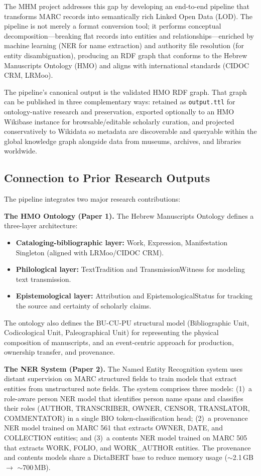 \documentclass[12pt]{article}
\newcommand{\code}[1]{\texttt{#1}}
\begin{document}
The MHM project addresses this gap by developing an end-to-end pipeline that transforms MARC records into semantically rich Linked Open Data (LOD). The pipeline is not merely a format conversion tool; it performs conceptual decomposition---breaking flat records into entities and relationships---enriched by machine learning (NER for name extraction) and authority file resolution (for entity disambiguation), producing an RDF graph that conforms to the Hebrew Manuscripts Ontology (HMO) and aligns with international standards (CIDOC CRM, LRMoo).

The pipeline's canonical output is the validated HMO RDF graph. That graph can be published in three complementary ways: retained as \code{output.ttl} for ontology-native research and preservation, exported optionally to an HMO Wikibase instance for browsable/editable scholarly curation, and projected conservatively to Wikidata so metadata are discoverable and queryable within the global knowledge graph alongside data from museums, archives, and libraries worldwide.

\subsection{Connection to Prior Research Outputs}

The pipeline integrates two major research contributions:

\textbf{The HMO Ontology (Paper 1).} The Hebrew Manuscripts Ontology defines a three-layer architecture:
\begin{itemize}
\item \textbf{Cataloging-bibliographic layer:} Work, Expression, Manifestation Singleton (aligned with LRMoo/CIDOC CRM).
\item \textbf{Philological layer:} TextTradition and TransmissionWitness for modeling text transmission.
\item \textbf{Epistemological layer:} Attribution and EpistemologicalStatus for tracking the source and certainty of scholarly claims.
\end{itemize}

The ontology also defines the BU-CU-PU structural model (Bibliographic Unit, Codicological Unit, Paleographical Unit) for representing the physical composition of manuscripts, and an event-centric approach for production, ownership transfer, and provenance.

\textbf{The NER System (Paper 2).} The Named Entity Recognition system uses distant supervision on MARC structured fields to train models that extract entities from unstructured note fields. The system comprises three models: (1)~a role-aware person NER model that identifies person name spans and classifies their roles (AUTHOR, TRANSCRIBER, OWNER, CENSOR, TRANSLATOR, COMMENTATOR) in a single BIO token-classification head; (2)~a provenance NER model trained on MARC 561 that extracts OWNER, DATE, and COLLECTION entities; and (3)~a contents NER model trained on MARC 505 that extracts WORK, FOLIO, and WORK\_AUTHOR entities. The provenance and contents models share a DictaBERT base to reduce memory usage ($\sim$2.1\,GB $\to$ $\sim$700\,MB).
\end{document}
